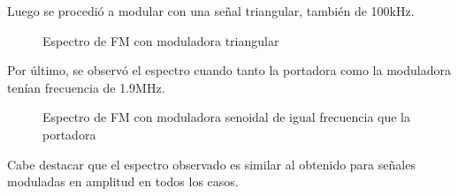 \documentclass[../../labo_tp5_main.tex]{subfiles}
\begin{document}
Luego se procedi\'o a modular con una se\~nal triangular, tambi\'en de 100kHz.

\begin{figure}[H]
	\centering
	\caption{Espectro de FM con moduladora triangular}
\end{figure}


Por \'ultimo, se observ\'o el espectro cuando tanto la portadora como la moduladora ten\'ian frecuencia de 1.9MHz.
\begin{figure}[H]
	\centering
	\caption{Espectro de FM con moduladora senoidal de igual frecuencia que la portadora}
\end{figure}

Cabe destacar que el espectro observado es similar al obtenido para se\~nales moduladas en amplitud en todos los casos.
\end{document}
